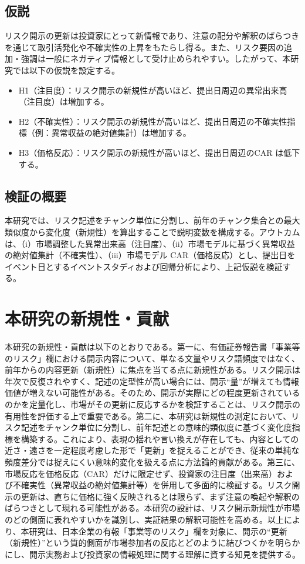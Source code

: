 \subsection{仮説}

リスク開示の更新は投資家にとって新情報であり、注意の配分や解釈のばらつきを通じて取引活発化や不確実性の上昇をもたらし得る。また、リスク要因の追加・強調は一般にネガティブ情報として受け止められやすい。したがって、本研究では以下の仮説を設定する。

\begin{itemize}
  \item H1（注目度）：リスク開示の新規性が高いほど、提出日周辺の異常出来高（注目度）は増加する。
  \item H2（不確実性）：リスク開示の新規性が高いほど、提出日周辺の不確実性指標（例：異常収益の絶対値集計）は増加する。
  \item H3（価格反応）：リスク開示の新規性が高いほど、提出日周辺のCAR は低下する。
\end{itemize}

\subsection{検証の概要}

本研究では、リスク記述をチャンク単位に分割し、前年のチャンク集合との最大類似度から変化度（新規性）を算出することで説明変数を構成する。アウトカムは、（i）市場調整した異常出来高（注目度）、（ii）市場モデルに基づく異常収益の絶対値集計（不確実性）、（iii）市場モデル CAR（価格反応）とし、提出日をイベント日とするイベントスタディおよび回帰分析により、上記仮説を検証する。

\section{本研究の新規性・貢献}

本研究の新規性・貢献は以下のとおりである。第一に、有価証券報告書「事業等のリスク」欄における開示内容について、単なる文量やリスク語頻度ではなく、前年からの内容更新（新規性）に焦点を当てる点に新規性がある。リスク開示は年次で反復されやすく、記述の定型性が高い場合には、開示“量”が増えても情報価値が増えない可能性がある。そのため、開示が実際にどの程度更新されているのかを定量化し、市場がその更新に反応するかを検証することは、リスク開示の有用性を評価する上で重要である。第二に、本研究は新規性の測定において、リスク記述をチャンク単位に分割し、前年記述との意味的類似度に基づく変化度指標を構築する。これにより、表現の揺れや言い換えが存在しても、内容としての近さ・遠さを一定程度考慮した形で「更新」を捉えることができ、従来の単純な頻度差分では捉えにくい意味的変化を扱える点に方法論的貢献がある。第三に、市場反応を価格反応（CAR）だけに限定せず、投資家の注目度（出来高）および不確実性（異常収益の絶対値集計等）を併用して多面的に検証する。リスク開示の更新は、直ちに価格に強く反映されるとは限らず、まず注意の喚起や解釈のばらつきとして現れる可能性がある。本研究の設計は、リスク開示新規性が市場のどの側面に表れやすいかを識別し、実証結果の解釈可能性を高める。以上により、本研究は、日本企業の有報「事業等のリスク」欄を対象に、開示の“更新（新規性）”という質的側面が市場参加者の反応とどのように結びつくかを明らかにし、開示実務および投資家の情報処理に関する理解に資する知見を提供する。


